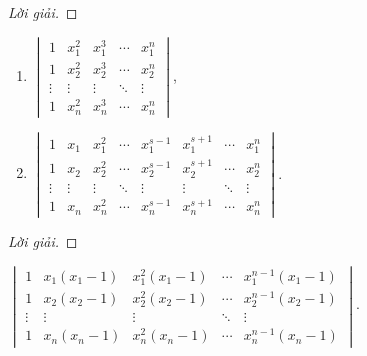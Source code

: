 \documentclass[class=linearalgebra,crop=false]{standalone}
\begin{document}
\begin{proof}[Lời giải]
\end{proof}

\begin{exercise}
    \begin{enumerate}[label = (\alph*)]
        \item $\begin{vmatrix}
                      1      & x_{1}^{2} & x_{1}^{3} & \cdots & x_{1}^{n} \\
                      1      & x_{2}^{2} & x_{2}^{3} & \cdots & x_{2}^{n} \\
                      \vdots & \vdots    & \vdots    & \ddots & \vdots    \\
                      1      & x_{n}^{2} & x_{n}^{3} & \cdots & x_{n}^{n}
                  \end{vmatrix}$,
        \item $\begin{vmatrix}
                      1      & x_{1}  & x_{1}^{2} & \cdots & x_{1}^{s-1} & x_{1}^{s+1} & \cdots & x_{1}^{n} \\
                      1      & x_{2}  & x_{2}^{2} & \cdots & x_{2}^{s-1} & x_{2}^{s+1} & \cdots & x_{2}^{n} \\
                      \vdots & \vdots & \vdots    & \ddots & \vdots      & \vdots      & \ddots & \vdots    \\
                      1      & x_{n}  & x_{n}^{2} & \cdots & x_{n}^{s-1} & x_{n}^{s+1} & \cdots & x_{n}^{n}
                  \end{vmatrix}$.
    \end{enumerate}
\end{exercise}

\begin{proof}[Lời giải]
\end{proof}

\begin{exercise}
    $\begin{vmatrix}
            1      & x_{1}(x_{1} - 1) & x_{1}^{2}(x_{1} - 1) & \cdots & x_{1}^{n-1}(x_{1} - 1) \\
            1      & x_{2}(x_{2} - 1) & x_{2}^{2}(x_{2} - 1) & \cdots & x_{2}^{n-1}(x_{2} - 1) \\
            \vdots & \vdots           & \vdots               & \ddots & \vdots                 \\
            1      & x_{n}(x_{n} - 1) & x_{n}^{2}(x_{n} - 1) & \cdots & x_{n}^{n-1}(x_{n} - 1)
        \end{vmatrix}$.
\end{exercise}
\end{document}
